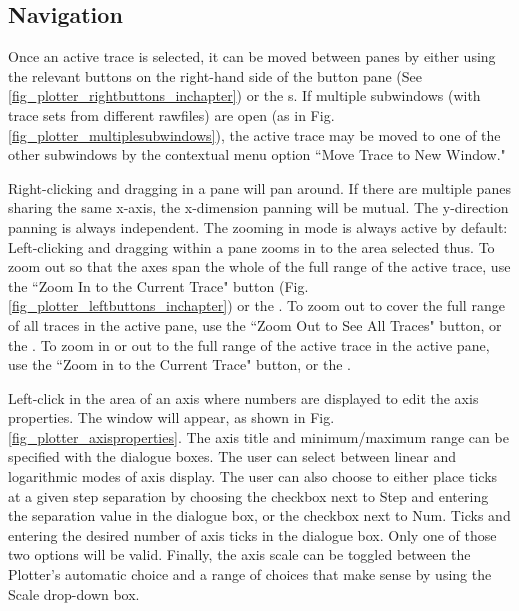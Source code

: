 \subsection{Navigation}
\label{subsec_pane_navigation}

 Once an active trace is selected, it can be moved between panes by either using the relevant buttons on the right-hand side of the button pane (See \ref{fig_plotter_rightbuttons_inchapter}) or the s. If multiple subwindows (with trace sets from different rawfiles) are open (as in Fig. \ref{fig_plotter_multiplesubwindows}), the active trace may be moved to one of the other subwindows by the contextual menu option ``\textsf{Move Trace to New Window}."

\newpage

 Right-clicking and dragging in a pane will pan around.  If there are multiple panes sharing the same x-axis, the x-dimension panning will be mutual.  The y-direction panning is always independent.  The zooming in mode is always active by default: Left-clicking and dragging within a pane zooms in to the area selected thus.  To zoom out so that the axes span the whole of the full range of the active trace, use the ``Zoom In to the Current Trace" button (Fig. \ref{fig_plotter_leftbuttons_inchapter}) or the .  To zoom out to cover the full range of all traces in the active pane, use the ``Zoom Out to See All Traces" button, or the . To zoom in or out to the full range of the active trace in the active pane, use the ``Zoom in to the Current Trace" button, or the .

 Left-click in the area of an axis where numbers are displayed to edit the axis properties. The  window will appear, as shown in Fig. \ref{fig_plotter_axisproperties}. The axis title and minimum/maximum range can be specified with the dialogue boxes.  The user can select between linear and logarithmic modes of axis display.  The user can also choose to either place ticks at a given step separation by choosing the checkbox next to \textsf{Step} and entering the separation value in the dialogue box, or the checkbox next to \textsf{Num. Ticks} and entering the desired number of axis ticks in the dialogue box.  Only one of those two options will be valid.  Finally, the axis scale can be toggled between the Plotter's automatic choice and a range of choices that make sense by using the \textsf{Scale} drop-down box.



